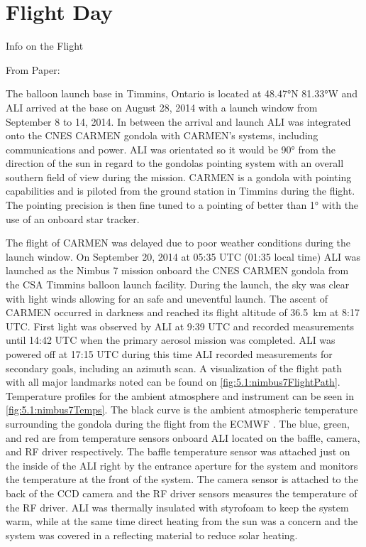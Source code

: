 \section{Flight Day}

Info on the Flight

From Paper:

The balloon launch base in Timmins, Ontario is located at 48.47\si{\degree}N 81.33\si{\degree}W and ALI arrived at the base on August 28, 2014 with a launch window from September 8 to 14, 2014. In between the arrival and launch ALI was integrated onto the CNES CARMEN gondola with CARMEN's systems, including communications and power. ALI was orientated so it would be 90\si{\degree} from the direction of the sun in regard to the gondolas pointing system with an overall southern field of view during the mission. CARMEN is a gondola with pointing capabilities and is piloted from the ground station in Timmins during the flight. The pointing precision is then fine tuned to a pointing of better than 1\si{\degree} with the use of an onboard star tracker.

The flight of CARMEN was delayed due to poor weather conditions during the launch window. On September 20, 2014 at 05:35 UTC (01:35 local time) ALI was launched as the Nimbus 7 mission onboard the CNES CARMEN gondola from the CSA Timmins balloon launch facility. During the launch, the sky was clear with light winds allowing for an safe and uneventful launch. The ascent of CARMEN occurred in darkness and reached its flight altitude of 36.5~km at 8:17 UTC. First light was observed by ALI at 9:39 UTC and recorded measurements until 14:42 UTC when the primary aerosol mission was completed. ALI was powered off at 17:15 UTC during this time ALI recorded measurements for secondary goals, including an azimuth scan. A visualization of the flight path with all major landmarks noted can be found on \autoref{fig:5.1:nimbus7FlightPath}. Temperature profiles for the ambient atmosphere and instrument can be seen in \autoref{fig:5.1:nimbus7Temps}. The black curve is the ambient atmospheric temperature surrounding the gondola during the flight from the ECMWF \citep{Molteni1996}. The blue, green, and red are from temperature sensors onboard ALI located on the baffle, camera, and RF driver respectively. The baffle temperature sensor was attached just on the inside of the ALI right by the entrance aperture for the system and monitors the temperature at the front of the system. The camera sensor is attached to the back of the CCD camera and the RF driver sensors measures the temperature of the RF driver. ALI was thermally insulated with styrofoam to keep the system warm, while at the same time direct heating from the sun was a concern and the system was covered in a reflecting material to reduce solar heating.

